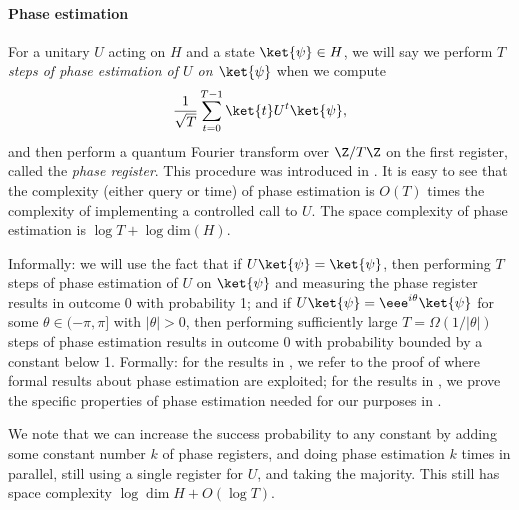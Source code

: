 \documentclass{toc}
\begin{document}
\paragraph{Phase estimation}

For a unitary $U$ acting on $H$ and a state $\ket{\psi}\in H$, we will say we perform \emph{$T$ steps of phase estimation of $U$ on $\ket{\psi}$} when we compute %
$$\frac{1}{\sqrt{T}}\sum_{t=0}^{T-1}\ket{t}U^t\ket{\psi},$$
and then perform a quantum Fourier transform over $\Z/T\Z$ on the first register, called the \emph{phase register}.
This procedure was introduced in \cite{kit95}. It is easy to see that the complexity (either query or time) of phase estimation is $O(T)$ times the complexity of implementing a controlled call to $U$. The space complexity of phase estimation is $\log T+\log\mathrm{dim}(H)$.

Informally: we will use the fact that if $U\ket{\psi}=\ket{\psi}$, then performing $T$ steps of phase estimation of $U$ on $\ket{\psi}$ and measuring the phase register results in outcome 0 with probability 1; and if $U\ket{\psi}=\eee^{i\theta}\ket{\psi}$ for some $\theta\in (-\pi,\pi]$ with $|\theta|>0$, then performing sufficiently large $T=\Omega(1/|\theta|)$ steps of phase estimation results in outcome 0 with probability bounded by a constant below 1. Formally: for the results in , we refer to the proof of \cite[Lemma 3.2]{IJ15} where formal results about phase estimation are exploited; for the results in , we prove the specific properties of phase estimation needed for our purposes in . 

We note that we can increase the success probability to any constant by adding some constant number $k$ of phase registers, and doing phase estimation $k$ times in parallel, still using a single register for $U$, and taking the majority. This still has space complexity $\log\dim H + O(\log T)$.
\end{document}
